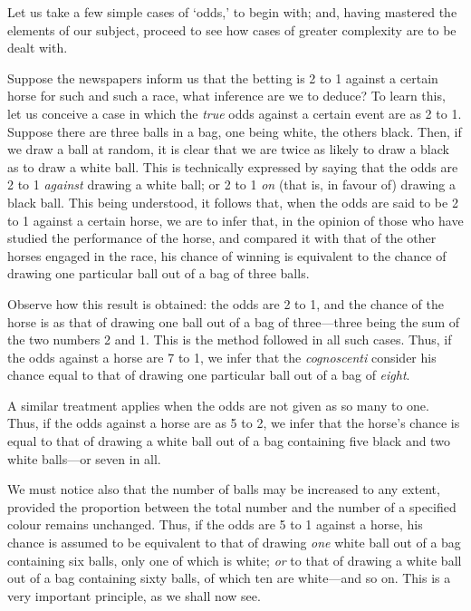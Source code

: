 \documentclass[letterpaper,12pt,oneside,openany]{memoir}
\begin{document}
Let us take a few simple cases of `odds,' to begin
with; and, having mastered the elements of our subject,
proceed to see how cases of greater complexity are to be
dealt with.

Suppose the newspapers inform us that the betting
is 2 to 1 against a certain horse for such and such a
race, what inference are we to deduce? To learn this,
let us conceive a case in which the \textit{true} odds against a
certain event are as 2 to 1. Suppose there are three
balls in a bag, one being white, the others black. Then,
if we draw a ball at random, it is clear that we are
twice as likely to draw a black as to draw a white ball.
This is technically expressed by saying that the odds
are 2 to 1 \textit{against} drawing a white ball; or 2 to 1 \textit{on}
(that is, in favour of) drawing a black ball. This
being understood, it follows that, when the odds are
said to be 2 to 1 against a certain horse, we are to infer
that, in the opinion of those who have studied the performance
of the horse, and compared it with that of
the other horses engaged in the race, his chance of
winning is equivalent to the chance of drawing one
particular ball out of a bag of three balls.

Observe how this result is obtained: the odds are 2
to 1, and the chance of the horse is as that of drawing
one ball out of a bag of three---three being the sum of
the two numbers 2 and 1. This is the method followed
in all such cases. Thus, if the odds against a horse
are 7 to 1, we infer that the \textit{cognoscenti} consider his
chance equal to that of drawing one particular ball out
of a bag of \textit{eight}.

A similar treatment applies when the odds are not
given as so many to one. Thus, if the odds against a
horse are as 5 to 2, we infer that the horse's chance is
equal to that of drawing a white ball out of a bag
containing five black and two white balls---or seven in
all.

We must notice also that the number of balls may
be increased to any extent, provided the proportion
between the total number and the number of a specified
colour remains unchanged. Thus, if the odds are 5 to 1
against a horse, his chance is assumed to be equivalent
to that of drawing \textit{one} white ball out of a bag containing
six balls, only one of which is white; \textit{or} to that of
drawing a white ball out of a bag containing sixty balls,
of which ten are white---and so on. This is a very
important principle, as we shall now see.
\end{document}

